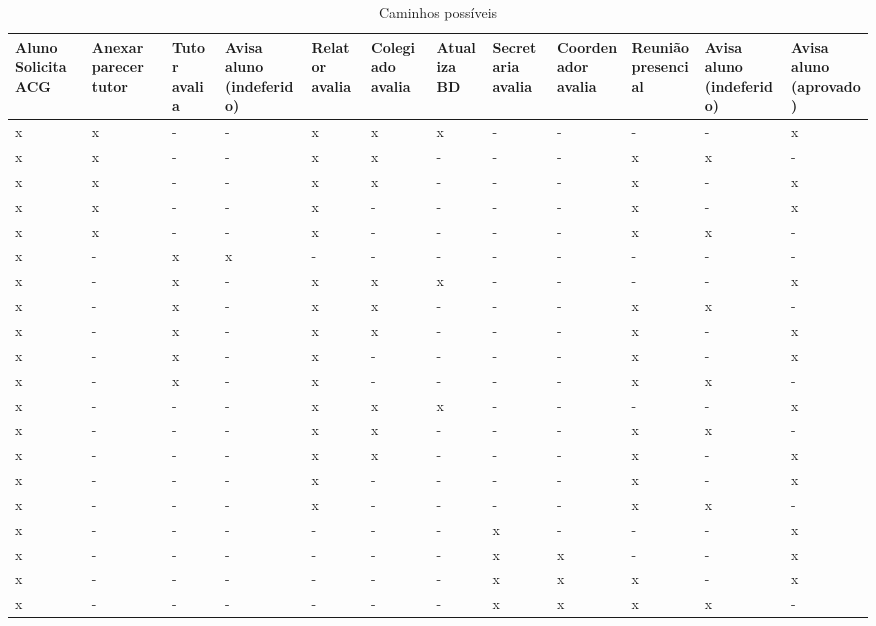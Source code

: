 \documentclass[12pt]{article}
\begin{document}
\begin{table}
{\scriptsize
\begin{tabular}{|p{1cm}|p{1cm}|p{1cm}|p{1cm}|p{1cm}|p{1cm}|p{1cm}|p{1cm}|p{1cm}|p{1cm}|p{1cm}|p{1cm}|}
\hline
Aluno Solicita ACG & Anexar parecer tutor & Tutor avalia & Avisa aluno (indeferido) & Rela\-tor avalia & Cole\-giado avalia & Atu\-aliza BD & Secre\-taria avalia & Coorde\-nador avalia & Reuni\-ão presencial & Avisa aluno (indeferido) & Avisa aluno (aprovado) \\\hline
x & x & - & - & x & x & x & - & - & - & - & x\\\hline
x & x & - & - & x & x & - & - & - & x & x & -\\\hline
x & x & - & - & x & x & - & - & - & x & - & x\\\hline
x & x & - & - & x & - & - & - & - & x & - & x\\\hline
x & x & - & - & x & - & - & - & - & x & x & -\\\hline
x & - & x & x & - & - & - & - & - & - & - & -\\\hline
x & - & x & - & x & x & x & - & - & - & - & x\\\hline
x & - & x & - & x & x & - & - & - & x & x & -\\\hline
x & - & x & - & x & x & - & - & - & x & - & x\\\hline
x & - & x & - & x & - & - & - & - & x & - & x\\\hline
x & - & x & - & x & - & - & - & - & x & x & -\\\hline
x & - & - & - & x & x & x & - & - & - & - & x\\\hline
x & - & - & - & x & x & - & - & - & x & x & -\\\hline
x & - & - & - & x & x & - & - & - & x & - & x\\\hline
x & - & - & - & x & - & - & - & - & x & - & x\\\hline
x & - & - & - & x & - & - & - & - & x & x & -\\\hline
x & - & - & - & - & - & - & x & - & - & - & x\\\hline
x & - & - & - & - & - & - & x & x & - & - & x\\\hline
x & - & - & - & - & - & - & x & x & x & - & x\\\hline
x & - & - & - & - & - & - & x & x & x & x & -\\\hline
\end{tabular}
}
\caption{Caminhos possíveis}
\label{tab:tabelaCaminhos}
\end{table}
\end{document}

